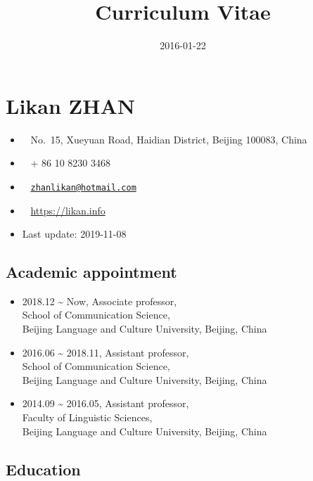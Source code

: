 \documentclass[12pt,]{article}
\title{Curriculum Vitae}
\author{}
\date{2016-01-22}
\providecommand{\tightlist}{%
  \setlength{\itemsep}{0pt}\setlength{\parskip}{0pt}}
\begin{document}
\maketitle

\hypertarget{likan-zhan}{%
\section{Likan ZHAN}\label{likan-zhan}}

\begin{itemize}
\tightlist
\item
  \faUniversity ~ No.~15, Xueyuan Road, Haidian District, Beijing
  100083, China
\item
  \faPhone* ~ + 86 10 8230 3468
\item
  \faEnvelope[regular] ~
  \href{mailto:zhanlikan@hotmail.com}{\nolinkurl{zhanlikan@hotmail.com}}
\item
  \faGlobe ~ \url{https://likan.info}
\item
  Last update: 2019-11-08
\end{itemize}

\hypertarget{academic-appointment}{%
\subsection{Academic appointment}\label{academic-appointment}}

\begin{itemize}
\item
  2018.12 \textasciitilde{} Now, Associate professor,\\
  School of Communication Science,\\
  Beijing Language and Culture University, Beijing, China
\item
  2016.06 \textasciitilde{} 2018.11, Assistant professor,\\
  School of Communication Science,\\
  Beijing Language and Culture University, Beijing, China
\item
  2014.09 \textasciitilde{} 2016.05, Assistant professor,\\
  Faculty of Linguistic Sciences,\\
  Beijing Language and Culture University, Beijing, China
\end{itemize}

\hypertarget{education}{%
\subsection{Education}\label{education}}
\end{document}
